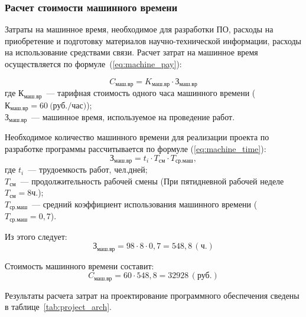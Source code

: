 \subsubsection{Расчет стоимости машинного времени}

Затраты на машинное время, необходимое для разработки ПО, расходы на приобретение и подготовку материалов научно-технической информации, расходы на использование средствами связи. Расчет затрат на машинное время осуществляется по формуле~(\ref{eq:machine_pay}):

\begin{equation}\label{eq:machine_pay}
	C_{\text{маш.вр}} = K_{\text{маш.вр}} \cdot \text{З}_{\text{маш.вр}}
\end{equation}
где $К_{\text{маш.вр}}$~--- тарифная стоимость одного часа машинного времени ($К_{\text{маш.вр}} = 60~\text{(руб./час)}$); \\
$\text{З}_{\text{маш.вр}}$~--- машинное время, используемое на проведение работ.

Необходимое количество машинного времени для реализации проекта по разработке программы рассчитывается по формуле (\ref{eq:machine_time}):
\begin{equation}\label{eq:machine_time}
	\text{З}_{\text{маш.вр}} = t_i \cdot T_{\text{см}} \cdot T_{\text{ср.маш}},
\end{equation}
где $t_i$~--- трудоемкость работ, чел.дней; \\
$T_{\text{см}}$~--- продолжительность рабочей смены (При пятидневной рабочей неделе $T_{\text{см}} = 8 \text{ч.}$); \\
$T_{\text{ср.маш}}$~--- средний коэффициент использования машинного времени ($T_{\text{ср.маш}} = 0{,}7$).

Из этого следует:
\begin{equation*}
	\text{З}_{\text{маш.вр}} = 98 \cdot 8 \cdot 0{,}7 = 548{,}8\,(\text{ч.})
\end{equation*}

Стоимость машинного времени составит:
\begin{equation*}
	C_{\text{маш.вр}} = 60 \cdot 548{,}8 = 32928\,(\text{руб.})
\end{equation*}

Результаты расчета затрат на проектирование программного обеспечения
сведены в таблице~\ref{tab:project_arch}.


